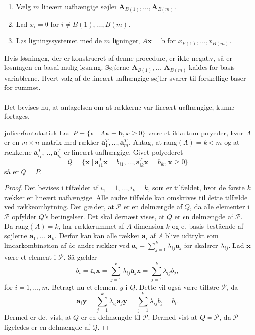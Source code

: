 \begin{enumerate}
\item Vælg $m$ lineært uafhængige søjler $\textbf{A}_{B(1)},\ldots,\textbf{A}_{B(m)}.$
\item Lad $x_i=0$ for $i \neq B(1),\ldots,B(m).$
\item Løs ligningssystemet med de $m$ ligninger, $A\textbf{x}=\textbf{b}$ for $x_{B(1)}, \ldots , x_{B(m)}.$
\end{enumerate}
Hvis løsningen, der er konstrueret af denne procedure, er ikke-negativ, så er løsningen en basal mulig løsning. Søjlerne $\textbf{A}_{B(1)},\ldots,\textbf{A}_{B(m)}$ kaldes for basis variablerne. Hvert valg af de lineært uafhængige søjler svarer til forskellige baser for rummet.
\\\\
\noindent
Det bevises nu, at antagelsen om at rækkerne var lineært uafhængige, kunne fortages.
\begin{thm}{}{julieerfantalastisk}
Lad $P=\{\textbf{x} \mid  A\textbf{x}=\textbf{b},x\geq 0\}$ være et ikke-tom polyeder, hvor $A$ er en $m \times n$ matrix med rækker $\textbf{a}^{T}_{1},\ldots,\textbf{a}^{T}_{m}$.
Antag, at rang$(A)=k<m$ og at rækkerne $\textbf{a}^T_{i_1},\ldots,\textbf{a}^T_{i_k}$ er lineært uafhængige. Givet polyederet 
$$Q=\{\textbf{x} \mid \textbf{a}^T_{i1}\textbf{x}=b_{i1},\ldots,\textbf{a}^T_{ik}\textbf{x}=b_{ik}, \textbf{x} \geq 0  \}$$ 
så er $Q=P$.
\end{thm}
\begin{proof}
Det bevises i tilfældet af $i_1=1,\ldots,i_k=k$, som er tilfældet, hvor de første $k$ rækker er lineært uafhængige. 
Alle andre tilfælde kan omskrives til dette tilfælde ved rækkeombytning. 
Det gælder, at $\mathcal{P}$ er en delmængde af $Q$, da alle elementer i $\mathcal{P}$ opfylder $Q$'s betingelser. 
Det skal dernæst vises, at $Q$ er en delmængde af $\mathcal{P}$.
Da rang$(A)=k$, har rækkerummet af $A$ dimension $k$ og et basis bestående af søjlerne $\textbf{a}_1,\ldots,\textbf{a}_k$. 
Derfor kan kan alle rækker $\textbf{a}_i$ af $A$ blive udtrykt som linearkombination af de andre rækker ved $\textbf{a}_i=\sum^{k}_{j=1}\lambda_{ij}\textbf{a}_j$ for skalarer $\lambda_{ij}$. 
Lad $\textbf{x}$ være et element i $\mathcal{P}$. 
Så gælder
$$b_i=\textbf{a}_i\textbf{x}=\sum^{k}_{j=1}\lambda_{ij}\textbf{a}_j\textbf{x}=\sum^{k}_{j=1}\lambda_{ij}b_j,$$
for $i=1,\ldots,m.$
Betragt nu et element $y$ i $Q$. 
Dette vil også være tilhøre $\mathcal{P}$, da
$$ \textbf{a}_i\textbf{y}=\sum^{k}_{j=1}\lambda_{ij}\textbf{a}_j\textbf{y}=\sum^{k}_{j=1}\lambda_{ij}b_j=b_i.$$
Dermed er det vist, at $Q$ er en delmængde til $\mathcal{P}$. 
Dermed vist at $Q=\mathcal{P}$, da $\mathcal{P}$ ligeledes er en delmængde af $Q$.
\end{proof} \\